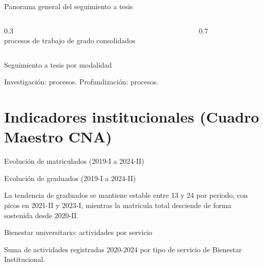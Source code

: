 \documentclass[aspectratio=169, 11pt]{beamer}
\begin{document}
\begin{frame}{Panorama general del seguimiento a tesis}
  \begin{columns}[T]
    \begin{column}{0.3\textwidth}
      \centering
      {\Huge \textbf{\color{udBlue}\TotalProcesosTesis}}\\
      \small procesos de trabajo de grado consolidados
    \end{column}
    \begin{column}{0.7\textwidth}
      \resizebox{\linewidth}{!}{\ChartTesisEtapa}
    \end{column}
  \end{columns}
\end{frame}

\begin{frame}{Seguimiento a tesis por modalidad}
  \centering
  \resizebox{0.92\linewidth}{!}{\ChartTesisModalidad}
  \par
  \vspace{0.2cm}
  \small Investigación: \textbf{\TotalTesisInv} procesos. Profundización: \textbf{\TotalTesisProf} procesos.
\end{frame}

\section{Indicadores institucionales (Cuadro Maestro CNA)}

\begin{frame}{Evolución de matriculados (2019-I a 2024-II)}
  \centering
  \resizebox{0.92\linewidth}{!}{\ChartCNAMatriculados}
\end{frame}

\begin{frame}{Evolución de graduados (2019-I a 2024-II)}
  \centering
  \resizebox{0.92\linewidth}{!}{\ChartCNAGraduados}
  \par
  \vspace{0.2cm}
  \small La tendencia de graduados se mantiene estable entre 13 y 24 por periodo, con picos en 2021-II y 2023-I, mientras la matrícula total desciende de forma sostenida desde 2020-II.
\end{frame}

\begin{frame}{Bienestar universitario: actividades por servicio}
  \centering
  \resizebox{0.85\linewidth}{!}{\ChartBienestar}
  \par
  \vspace{0.2cm}
  \small Suma de actividades registradas 2020-2024 por tipo de servicio de Bienestar Institucional.
\end{frame}
\end{document}
